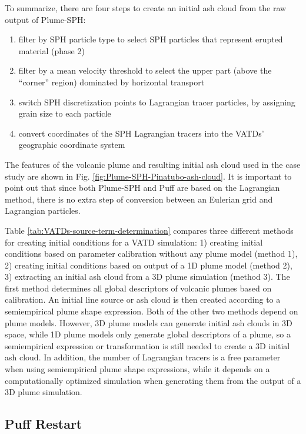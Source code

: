 \documentclass[utf8]{frontiersSCNS} %
\begin{document}
To summarize, there are four steps to create an initial ash cloud from the raw output of Plume-SPH:
\begin{enumerate}
\item filter by SPH particle type to select SPH particles that represent erupted material (phase 2)
\item filter by a mean velocity threshold to select the upper part (above the ``corner'' region) dominated by horizontal transport
\item switch SPH discretization points to Lagrangian tracer particles, by assigning grain size to each particle
\item convert coordinates of the SPH Lagrangian tracers into the VATDs' geographic coordinate system
\end{enumerate}
The features of the volcanic plume and resulting initial ash cloud used in the case study are shown in Fig. \ref{fig:Plume-SPH-Pinatubo-ash-cloud}. It is important to point out that since both Plume-SPH and Puff are based on the Lagrangian method, there is no extra step of conversion between an Eulerian grid and Lagrangian particles.

Table \ref{tab:VATDs-source-term-determination} compares three different methods for creating initial conditions for a VATD simulation: 1) creating initial conditions based on parameter calibration without any plume model (method 1), 2) creating initial conditions based on output of a 1D plume model (method 2), 3) extracting an initial ash cloud from a 3D plume simulation (method 3). The first method determines all global descriptors of volcanic plumes based on calibration. An initial line source or ash cloud is then created according to a semiempirical plume shape expression. Both of the other two methods depend on plume models. However, 3D plume models can generate initial ash clouds in 3D space, while 1D plume models only generate global descriptors of a plume, so a semiempirical expression or transformation is still needed to create a 3D initial ash cloud. In addition, the number of Lagrangian tracers is a free parameter when using semiempirical plume shape expressions, while it depends on a computationally optimized simulation when generating them from the output of a 3D plume simulation.

\subsection{Puff Restart}
\end{document}
